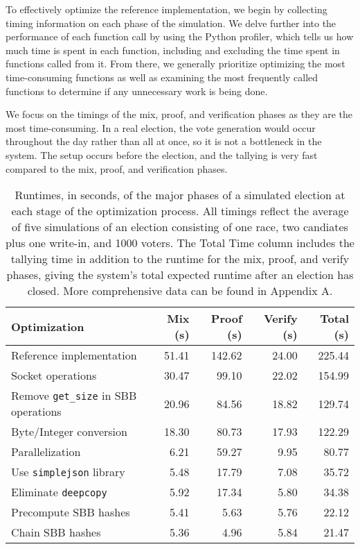 To effectively optimize the reference implementation, we begin by collecting timing information on each phase of the simulation. We delve further into the performance of each function call by using the Python profiler, which tells us how much time is spent in each function, including and excluding the time spent in functions called from it. From there, we generally prioritize optimizing the most time-consuming functions as well as examining the most frequently called functions to determine if any unnecessary work is being done.

We focus on the timings of the mix, proof, and verification phases as they are the most time-consuming. In a real election, the vote generation would occur throughout the day rather than all at once, so it is not a bottleneck in the system. The setup occurs before the election, and the tallying is very fast compared to the mix, proof, and verification phases.

\begin{table}[htbp]
\centering
\begin{tabular}{l | r | r | r || r}
  \textbf{Optimization} & \textbf{Mix (s)} & \textbf{Proof (s)} & \textbf{Verify (s)} & \textbf{Total (s)} \\
  \hline
  Reference implementation & 51.41 & 142.62 & 24.00 & 225.44 \\
  Socket operations & 30.47 & 99.10 & 22.02 & 154.99 \\
  Remove \texttt{get\_size} in SBB operations & 20.96 & 84.56 & 18.82 & 129.74 \\
  Byte/Integer conversion & 18.30 & 80.73 & 17.93 & 122.29 \\
  Parallelization & 6.21 & 59.27 & 9.95 & 80.77 \\
  Use \texttt{simplejson} library & 5.48 & 17.79 & 7.08 & 35.72 \\
  Eliminate \texttt{deepcopy} & 5.92 & 17.34 & 5.80 & 34.38 \\
  Precompute SBB hashes & 5.41 & 5.63 & 5.76 & 22.12 \\
  Chain SBB hashes & 5.36 & 4.96 & 5.84 & 21.47
\end{tabular}
\caption[Election runtime at each stage of optimization]{Runtimes, in seconds, of the major phases of a simulated election at each stage of the optimization process. All timings reflect the average of five simulations of an election consisting of one race, two candiates plus one write-in, and 1000 voters. The Total Time column includes the tallying time in addition to the runtime for the mix, proof, and verify phases, giving the system's total expected runtime after an election has closed. More comprehensive data can be found in Appendix A.}
\label{table:perf:optimizations}
\end{table}


